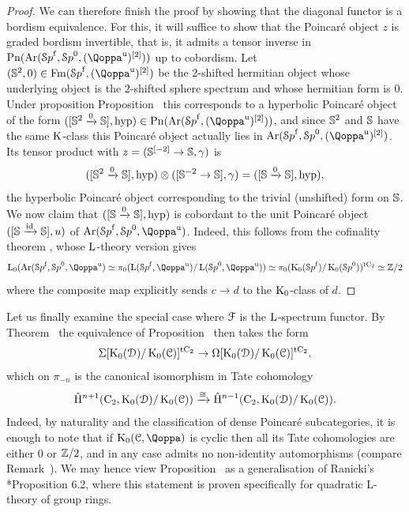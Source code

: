 \begin{proof}
We can therefore finish the proof by showing that the diagonal functor is a bordism equivalence. 
For this, it will suffice to show that the Poincaré object $z$
is graded bordism invertible, that is, it admits a tensor inverse in $\Poinc(\Ar(\Spaf,\Spa^0,(\QF^{\uni})\qshift{2}))$ up to cobordism. Let $(\SS^2,0) \in \spsforms(\Spaf,(\QF^{\uni})\qshift{2})$ be the 2-shifted hermitian object whose underlying object is the $2$-shifted sphere spectrum and whose hermitian form is $0$. Under proposition Proposition~ this corresponds to a hyperbolic Poincaré object of the form $([\SS^2 \xrightarrow{0} \SS],\hyp) \in \Poinc(\Ar(\Spaf,(\QF^{\uni})\qshift{2}))$, and since $\mathbb{S}^2$ and $\mathbb{S}$ have the same $\operatorname K$-class this Poincaré object actually lies in $\Ar(\Spaf,\Spa^0,(\QF^{\uni})\qshift{2})$. Its tensor product with $z=(\mathbb{S}^{[-2]}\to \mathbb{S}, \gamma)$ is
\[
([\mathbb{S}^2 \xrightarrow{0} \mathbb{S}],\mathrm{hyp}) \otimes ([\mathbb{S}^{-2} \to \mathbb{S}],\gamma) = ([\mathbb{S} \xrightarrow{0} \mathbb{S}],\mathrm{hyp}),
\]
the hyperbolic Poincaré object corresponding to the trivial (unshifted) form on $\mathbb{S}$. We now claim
that $([\mathbb{S} \xrightarrow{0} \mathbb{S}],\mathrm{hyp})$ is cobordant to the unit Poincaré object $([\mathbb{S} \xrightarrow{\mathrm{id}} \mathbb{S}],u)$ of $\Ar(\Spaf,\Spa^0,\QF^{\uni})$. Indeed, this follows from the cofinality theorem , whose $\operatorname L$-theory version gives 
\[
\L_0(\Ar(\Spaf, \Spa^0, \QF^{\uni}) \simeq \pi_0 (\L(\Spaf, \QF^{\uni})/\L(\Spa^0, \QF^{\uni})) \simeq \pi_0 (\K_0(\Spaf)/\K_0(\Spa^0))^\tC \simeq \ZZ/2
\]
where the composite map explicitly sends $c\to d$ to the $\operatorname K_0$-class of $d$. 
\end{proof}




 
Let us finally examine the special case where $\mathcal{F}$ is the $\operatorname L$-spectrum functor. 
By Theorem~
the equivalence of Proposition~ then takes the form
\[
\Sigma[\operatorname K_0(\mathcal{D})/\operatorname K_0(\mathcal C)]^{{\mathrm{t}\mathrm{C_2}}} \to \Omega[\operatorname K_0(\mathcal{D})/\operatorname K_0(\mathcal C)]^{{\mathrm{t}\mathrm{C_2}}} .
\]
which on $\pi_{-n}$ is the canonical isomorphism in Tate cohomology
\[
\hat{\mathrm{H}}^{n+1}(\mathrm{C_2},\operatorname K_0(\mathcal{D})/\operatorname K_0(\mathcal C)) \xrightarrow{\cong} \hat{\mathrm{H}}^{n-1}(\mathrm{C_2},\operatorname K_0(\mathcal{D})/\operatorname K_0(\mathcal C)) .
\]
Indeed, by naturality and the classification of dense Poincaré subcategories, it is enough to note that if $\K_0(\C,\QF)$ is cyclic then all its Tate cohomologies are
either $0$ or $\mathbb{Z}/2$, 
and in any case admits no non-identity automorphisms (compare Remark~).
We may hence view Proposition~ as a generalisation of Ranicki's \cite{Ranicki-splitting}*{Proposition 6.2}, where this statement is proven specifically for quadratic L-theory of group rings. 



